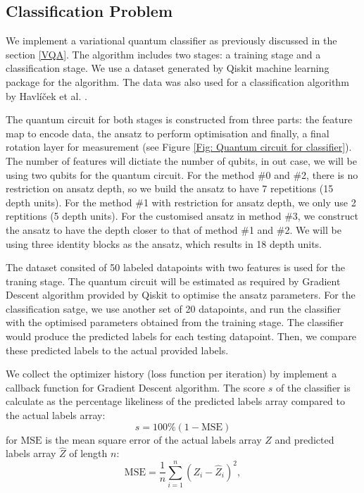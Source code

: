 \subsection{Classification Problem} \label{Sec: Classification Problem}
We implement a variational quantum classifier as previously discussed in the section \ref{VQA}.
The algorithm includes two stages: a training stage and a classification stage.
We use a dataset generated by Qiskit machine learning package for the algorithm.
The data was also used for a classification algorithm by Havlíček et al. \cite{havlicekSupervisedLearningQuantumenhanced2019}.

The quantum circuit for both stages is constructed from three parts: the feature map to encode data, the ansatz to perform optimisation and finally, a final rotation layer for measurement (see Figure \ref{Fig: Quantum circuit for classifier}).
The number of features will dictiate the number of qubits, in out case, we will be using two qubits for the quantum circuit.
For the method \#0 and \#2, there is no restriction on ansatz depth, so we build the ansatz to have 7 repetitions (15 depth units).
For the method \#1 with restriction for ansatz depth, we only use 2 reptitions (5 depth units).
For the customised ansatz in method \#3, we construct the ansatz to have the depth closer to that of method \#1 and \#2. We will be using three identity blocks as the ansatz, which results in 18 depth units.

The dataset consited of 50 labeled datapoints with two features is used for the traning stage.
The quantum circuit will be estimated as required by Gradient Descent algorithm provided by Qiskit to optimise the ansatz parameters.
For the classification satge, we use another set of 20 datapoints, and run the classifier with the optimised parameters obtained from the training stage.
The classifier would produce the predicted labels for each testing datapoint.
Then, we compare these predicted labels to the actual provided labels.

We collect the optimizer history (loss function per iteration) by implement a callback function for Gradient Descent algorithm.
The score $s$ of the classifier is calculate as the percentage likeliness of the predicted labels array compared to the actual labels array:
\begin{equation}
    s = 100\% (1 - \text{MSE})
\end{equation}
for $\text{MSE}$ is the mean square error of the actual labels array $Z$ and predicted labels array $\hat{Z}$ of length $n$:
\begin{equation}
    \text{MSE} = \frac{1}{n}\sum^n_{i=1}(Z_i - \hat{Z}_i)^2,
\end{equation}



